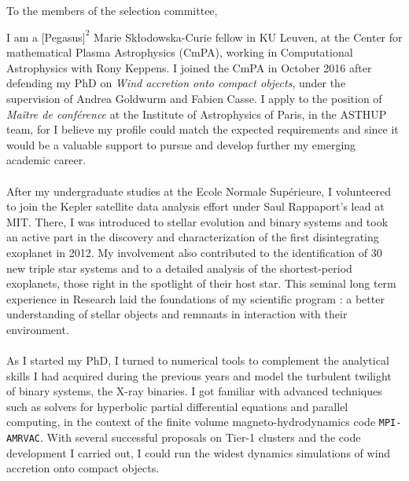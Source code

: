 \documentclass[12pt]{letter}
\begin{document}
 
 
\begin{letter} {}%
      


\date{February 21\textsuperscript{st}, 2019}
\opening{To the members of the selection committee,}
 
\thispagestyle{empty}
 
 

\hspace*{0.5cm} I am a $[$Pegasus$]^2$ Marie Sk\l{}odowska-Curie fellow in KU Leuven, at the Center for mathematical Plasma Astrophysics (CmPA), working in Computational Astrophysics with Rony Keppens. I joined the CmPA in October 2016 after defending my PhD on \textit{Wind accretion onto compact objects}, under the supervision of Andrea Goldwurm and Fabien Casse. I apply to the position of \textit{Ma\^{i}tre de conf\'erence} at the Institute of Astrophysics of Paris, in the ASTHUP team, for I believe my profile could match the expected requirements and since it would be a valuable support to pursue and develop further my emerging academic career. \\ \\
\hspace*{0.5cm} After my undergraduate studies at the Ecole Normale Sup\'erieure, I volunteered to join the Kepler satellite data analysis effort under Saul Rappaport's lead at MIT. There, I was introduced to stellar evolution and binary systems and took an active part in the discovery and characterization of the first disintegrating exoplanet in 2012. My involvement also contributed to the identification of 30 new triple star systems and to a detailed analysis of the shortest-period exoplanets, those right in the spotlight of their host star. This seminal long term experience in Research laid the foundations of my scientific program : a better understanding of stellar objects and remnants in interaction with their environment.\\ \\
\hspace*{0.5cm} As I started my PhD, I turned to numerical tools to complement the analytical skills I had acquired during the previous years and model the turbulent twilight of binary systems, the X-ray binaries. I got familiar with advanced techniques such as solvers for hyperbolic partial differential equations and parallel computing, in the context of the finite volume magneto-hydrodynamics code \texttt{MPI-AMRVAC}. With several successful proposals on Tier-1 clusters and the code development I carried out, I could run the widest dynamics simulations of wind accretion onto compact objects.\\


\end{letter}
\end{document}
